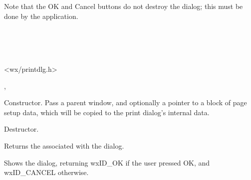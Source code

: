 Note that the OK and Cancel buttons do not destroy the dialog; this must be done by the
application.


\\
\\
\\


<wx/printdlg.h>


, 




Constructor. Pass a parent window, and optionally a pointer to a block of page setup
data, which will be copied to the print dialog's internal data.



Destructor.

\label{wxpagesetupdialoggetpagesetupdata}


Returns the  associated with the dialog.

\label{wxpagesetupdialogshowmodal}


Shows the dialog, returning wxID\_OK if the user pressed OK, and wxID\_CANCEL
otherwise.


